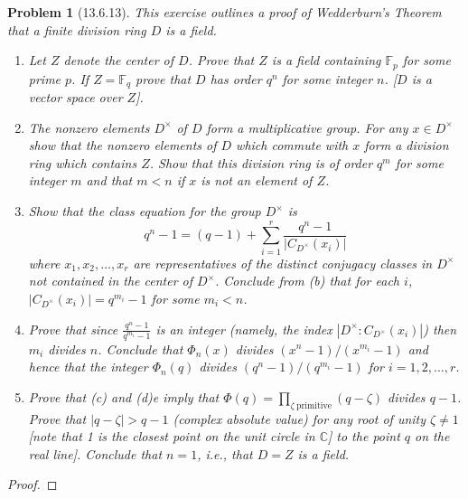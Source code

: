 \documentclass[10pt]{article}
\newcommand{\sk}{\vskip 10mm}
\newcommand{\bb}[1]{\mathbb{#1}}
\theoremstyle{plain}
\newtheorem{problem}{Problem}
\theoremstyle{remark}
\begin{document}
\begin{problem}[13.6.13]
  This exercise outlines a proof of Wedderburn's Theorem that a
  finite division ring $D$ is a field.
  \begin{enumerate}
  \item[(a)] Let $Z$ denote the center of $D$. Prove that $Z$ is
    a field containing $\bb{F}_p$ for some prime $p$. If $Z=\bb{F}_q$
    prove that $D$ has order $q^n$ for some integer $n$.
    [$D$ is a vector space over $Z$].
    
  \item[(b)] The nonzero elements $D^\times$ of $D$ form a multiplicative group.
    For any $x\in D^\times$ show that the nonzero elements of $D$ which commute
    with $x$ form a division ring which contains $Z$. Show that this
    division ring is of order $q^m$ for some integer $m$ and that $m<n$
    if $x$ is not an element of $Z$.
    
  \item[(c)] Show that the class equation for the group $D^\times$ is
    \[
      q^n-1=(q-1)+\sum_{i=1}^r\frac{q^n-1}{|C_{D^\times}(x_i)|}
    \]
    where $x_1,x_2,\ldots,x_r$ are representatives of the distinct
    conjugacy classes in $D^\times$ not contained in the center of $D^\times$.
    Conclude from (b) that for each $i$, $|C_{D^\times}(x_i)|=q^{m_i}-1$
    for some $m_i<n$.
    
  \item[(d)] Prove that since $\frac{q^n-1}{q^{m_i}-1}$ is an integer
    (namely, the index $|D^\times:C_{D^\times}(x_i)|$) then $m_i$ divides $n$.
    Conclude that $\Phi_n(x)$ divides $(x^n-1)/(x^{m_i}-1)$ and hence that the
    integer $\Phi_n(q)$ divides $(q^n-1)/(q^{m_i}-1)$ for $i=1,2,\ldots,r$.
    
  \item[(e)] Prove that (c) and (d)e imply that
    $\Phi(q)=\prod_{\zeta\ \mathrm{primitive}}(q-\zeta)$ divides $q-1$.
    Prove that $|q-\zeta|>q-1$ (complex absolute value) for any root
    of unity $\zeta\neq 1$ [note that 1 is the closest point on the unit circle
    in $\bb{C}$] to the point $q$ on the real line]. Conclude that
    $n=1$, i.e., that $D=Z$ is a field.
  \end{enumerate}
\end{problem}

\begin{proof}
  
\end{proof}

\sk
\end{document}
